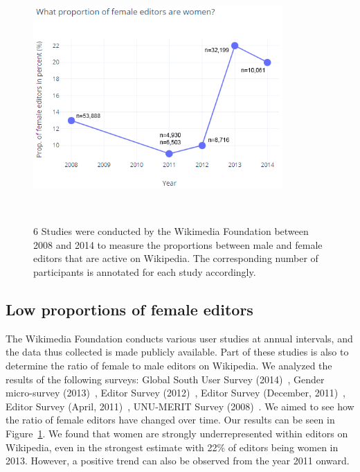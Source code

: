 \documentclass[a4paper, 11pt]{article}
\begin{document}
\begin{figure}[t]
	\centering
	\includegraphics[width=0.85\textwidth]{figures/PropFemaleEditors.png}
\caption{6 Studies were conducted by the Wikimedia Foundation between 2008 and 2014 to measure the proportions between male and female editors that are active on Wikipedia. The corresponding number of participants is annotated for each study accordingly.~\cite{shammaa2014}~\cite{fung2013}~\cite{tilman2012}}~\cite{pande2011}~\cite{khanna2011}~\cite{glott2010wikipedia} \label{fig:PropFemaleEditors}
\end{figure}

\subsection{Low proportions of female editors} \label{sec:gender-gap-wikipedia:prop-female-editors}
The Wikimedia Foundation conducts various user studies at annual intervals, and the data thus collected is made publicly available. Part of these studies is also to determine the ratio of female to male editors on Wikipedia. We analyzed the results of the following surveys: Global South User Survey (2014)~\cite{shammaa2014}, Gender micro-survey (2013)~\cite{fung2013}, Editor Survey (2012)~\cite{tilman2012}, Editor Survey (December, 2011)~\cite{pande2011}, Editor Survey (April, 2011)~\cite{khanna2011}, UNU-MERIT Survey (2008)~\cite{glott2010wikipedia}. We aimed to see how the ratio of female editors have changed over time. Our results can be seen in Figure~\ref{fig:PropFemaleEditors}. We found that women are strongly underrepresented within editors on Wikipedia, even in the strongest estimate with 22\% of editors being women in 2013. However, a positive trend can also be observed from the year 2011 onward.
\end{document}
